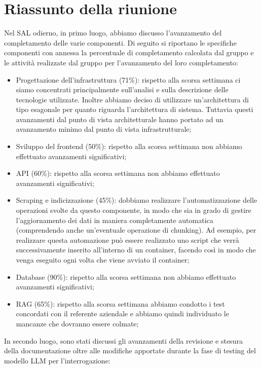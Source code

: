 \section{Riassunto della riunione}
Nel SAL odierno, in primo luogo, abbiamo discusso l'avanzamento del completamento delle varie componenti. Di seguito si riportano le specifiche componenti con annessa la percentuale di completamento calcolata dal gruppo e le attività realizzate dal gruppo per l'avanzamento del loro completamento:
\begin{itemize} 
    \item Progettazione dell'infrastruttura (71\%): rispetto alla scorsa settimana ci siamo concentrati principalmente sull'analisi e sulla descrizione delle tecnologie utilizzate. Inoltre abbiamo deciso di utilizzare un'architettura di tipo esagonale per quanto riguarda l'architettura di sistema. Tuttavia questi avanzamenti dal punto di vista architetturale hanno portato ad un avanzamento minimo dal punto di vista infrastrutturale;
    \item Sviluppo del frontend (50\%): rispetto alla scorsa settimana non abbiamo effettuato avanzamenti significativi;
    \item API (60\%): rispetto alla scorsa settimana non abbiamo effettuato avanzamenti significativi;
    \item Scraping e indicizzazione (45\%): dobbiamo realizzare l'automatizzazione delle operazioni svolte da questo componente, in modo che sia in grado di gestire l'aggiornamento dei dati in maniera completamente automatica (comprendendo anche un'eventuale operazione di chunking). Ad esempio, per realizzare questa automazione può essere realizzato uno script che verrà successivamente inserito all'interno di un container, facendo così in modo che venga eseguito ogni volta che viene avviato il container;
    \item Database (90\%): rispetto alla scorsa settimana non abbiamo effettuato avanzamenti significativi;
    \item RAG (65\%): rispetto alla scorsa settimana abbiamo condotto i test concordati con il referente aziendale e abbiamo quindi individuato le mancanze che dovranno essere colmate;
\end{itemize}
In secondo luogo, sono stati discussi gli avanzamenti della revisione e stesura della documentazione oltre alle modifiche apportate durante la fase di testing del modello LLM per l'interrogazione:
